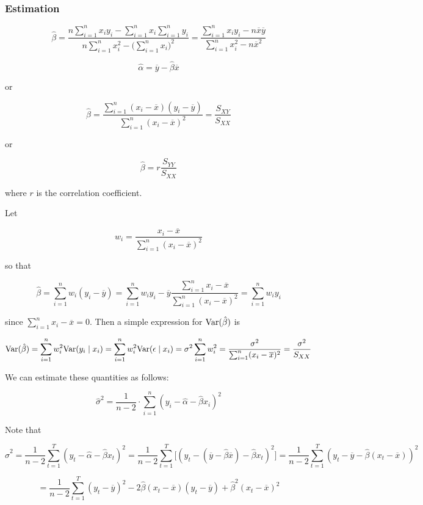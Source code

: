 \subsubsection{Estimation}

\[
\hat{\beta} = \frac{n\sum_{i=1}^n x_i y_i - \sum_{i=1}^n x_i \sum_{i=1}^n y_i}{n \sum_{i=1}^n x_i^2 - \big( \sum_{i=1}^n x_i \big)^2} = \frac{\sum_{i=1}^n x_i y_i - n \overline{x} \overline{y}}{\sum_{i=1}^n x_i^2 - n \overline{x}^2}
\]

\[
\hat{\alpha} = \overline{y} - \hat{\beta} \overline{x}
\]

or

\[
\hat{\beta} = \frac{\sum_{i=1}^n (x_i - \overline{x})(y_i - \overline{y})}{\sum_{i=1}^n(x_i - \overline{x})^2} = \frac{S_{XY}}{S_{XX}}
\]

or

\[
\hat{\beta} = r \frac{S_{YY}}{S_{XX}}
\]

where \(r\) is the correlation coefficient.

Let

\[
w_i = \frac{x_i - \overline{x}}{\sum_{i=1}^n (x_i - \overline{x})^2}
\]

so that 

\[
\hat{\beta} = \sum_{i=1}^n w_i( y_i - \overline{y}) = \sum_{i=1}^n w_i y_i  - \overline{y} \frac{  \sum_{i=1}^n x_i - \overline{x}}{\sum_{i=1}^n (x_i - \overline{x})^2} =  \sum_{i=1}^n w_i y_i 
\]

since \(  \sum_{i=1}^n x_i - \overline{x} = 0\). Then a simple expression for \(\Var(\hat{\beta})\) is 

\[
\Var(\hat{\beta}) = \sum_{i=1}^n w_i^2 \Var(y_i \mid x_i) = \sum_{i=1}^n w_i^2 \Var(\epsilon \mid x_i) = \sigma^2 \sum_{i=1}^n w_i^2 = \frac{\sigma^2}{\sum_{i=1}^n (x_i - \overline{x})^2} = \frac{\sigma^2}{S_{XX}}
\]

We can estimate these quantities as follows:

\[
\hat{\sigma}^2 = \frac{1}{n - 2} \cdot \sum_{i=1}^n(y_i - \hat{\alpha} - \hat{\beta} x_i)^2
\]

Note that

\[
\hat{\sigma}^2 =  \frac{1}{n - 2}\sum_{t=1}^T(y_t - \hat{\alpha} - \hat{\beta} x_t)^2 =  \frac{1}{n - 2}\sum_{t=1}^T \big[ (y_t - (\overline{y} - \hat{\beta} \overline{x}) - \hat{\beta} x_t)^2 \big] = \frac{1}{n - 2} \sum_{t=1}^T(y_t - \overline{y} - \hat{\beta}( x_t - \overline{x}))^2 
\]

\[
=\frac{1}{n - 2} \sum_{t=1}^T(y_t - \overline{y})^2 - 2\hat{\beta}( x_t - \overline{x})(y_t - \overline{y})+ \hat{\beta}^2( x_t - \overline{x})^2
\]

